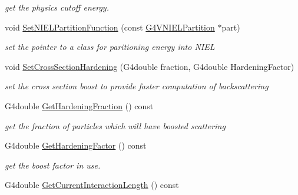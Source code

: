 \begin{DoxyCompactItemize}
\begin{DoxyCompactList}\small\item\em get the physics cutoff energy. \end{DoxyCompactList}\item 
void \hyperlink{classG4ScreenedNuclearRecoil_aebaeb123c972f0b1fd884b680da9ada6}{Set\-N\-I\-E\-L\-Partition\-Function} (const \hyperlink{classG4VNIELPartition}{G4\-V\-N\-I\-E\-L\-Partition} $\ast$part)
\begin{DoxyCompactList}\small\item\em set the pointer to a class for paritioning energy into N\-I\-E\-L \end{DoxyCompactList}\item 
void \hyperlink{classG4ScreenedNuclearRecoil_a82efdd93ae72c169ba4d137c0b1bd37f}{Set\-Cross\-Section\-Hardening} (G4double fraction, G4double Hardening\-Factor)
\begin{DoxyCompactList}\small\item\em set the cross section boost to provide faster computation of backscattering \end{DoxyCompactList}\item 
\hypertarget{classG4ScreenedNuclearRecoil_a2effa40b95cec0d0323a2f40f040aaff}{G4double \hyperlink{classG4ScreenedNuclearRecoil_a2effa40b95cec0d0323a2f40f040aaff}{Get\-Hardening\-Fraction} () const }\label{classG4ScreenedNuclearRecoil_a2effa40b95cec0d0323a2f40f040aaff}

\begin{DoxyCompactList}\small\item\em get the fraction of particles which will have boosted scattering \end{DoxyCompactList}\item 
\hypertarget{classG4ScreenedNuclearRecoil_a4aba65202fa37745d11c2b689fa36f00}{G4double \hyperlink{classG4ScreenedNuclearRecoil_a4aba65202fa37745d11c2b689fa36f00}{Get\-Hardening\-Factor} () const }\label{classG4ScreenedNuclearRecoil_a4aba65202fa37745d11c2b689fa36f00}

\begin{DoxyCompactList}\small\item\em get the boost factor in use. \end{DoxyCompactList}\item 
\hypertarget{classG4ScreenedNuclearRecoil_abe7517bfaa74ef1144acc5a221cd7ffa}{G4double \hyperlink{classG4ScreenedNuclearRecoil_abe7517bfaa74ef1144acc5a221cd7ffa}{Get\-Current\-Interaction\-Length} () const }\label{classG4ScreenedNuclearRecoil_abe7517bfaa74ef1144acc5a221cd7ffa}


\end{DoxyCompactItemize}
